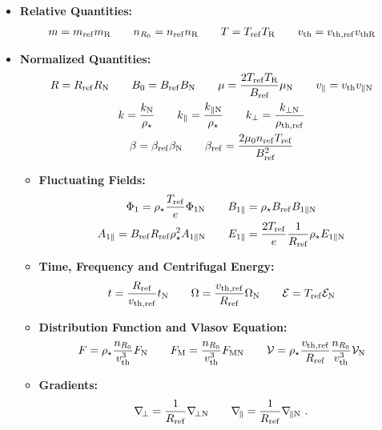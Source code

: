 \begin{itemize}
    \item \textbf{Relative Quantities:}
        \begin{gather*}
            m = m_\mathrm{ref} m_\mathrm{R} \qquad n_{R_0} = n_\mathrm{ref} n_\mathrm{R} \qquad T = T_\mathrm{ref} T_\mathrm{R} \qquad v_\mathrm{th} = v_{\mathrm{th},\mathrm{ref}} v_{\mathrm{th} \mathrm{R}}
        \end{gather*}
    \item \textbf{Normalized Quantities:}
        \begin{gather*}
            R = R_\mathrm{ref} R_\mathrm{N} \qquad B_0 = B_\mathrm{ref} B_\mathrm{N} \qquad \mu = \frac{2 T_\mathrm{ref} T_\mathrm{R}}{B_\mathrm{ref}} \mu_\mathrm{N} \qquad v_\parallel = v_\mathrm{th} v_{\parallel \mathrm{N}} \\
            k = \frac{k_\mathrm{N}}{\rho_\star} \qquad k_\parallel = \frac{k_{\parallel \mathrm{N}}}{\rho_\star} \qquad k_\perp = \frac{k_{\perp \mathrm{N}}}{\rho_{\mathrm{th},\mathrm{ref}}} \\
            \beta = \beta_\mathrm{ref} \beta_\mathrm{N} \qquad \beta_\mathrm{ref} = \frac{2 \mu_0 n_\mathrm{ref} T_\mathrm{ref}}{B_\mathrm{ref}^2}
        \end{gather*}
        \begin{itemize}
            \item \textbf{Fluctuating Fields:}
                \begin{gather*}
                    \Phi_1 = \rho_\star \frac{T_\mathrm{ref}}{e} \Phi_{1 \mathrm{N}} \qquad B_{1\parallel} = \rho_\star B_\mathrm{ref} B_{1\parallel \mathrm{N}} \\
                    A_{1\parallel} = B_\mathrm{ref} R_\mathrm{ref} \rho_\star^2 A_{1\parallel \mathrm{N}} \qquad E_{1\parallel} = \frac{2T_\mathrm{ref}}{e} \frac{1}{R_\mathrm{ref}} \rho_\star E_{1\parallel \mathrm{N}}
                \end{gather*}
            \item \textbf{Time, Frequency and Centrifugal Energy:}
                \begin{gather*}
                    t = \frac{R_\mathrm{ref}}{v_{\mathrm{th},\mathrm{ref}}} t_\mathrm{N} \qquad \Omega = \dfrac{v_{\mathrm{th},\mathrm{ref}}}{R_\mathrm{ref}} \Omega_\mathrm{N} \qquad \mathcal{E} = T_\mathrm{ref} \mathcal{E}_\mathrm{N}
                \end{gather*}
            \item \textbf{Distribution Function and Vlasov Equation:}
                \begin{gather*}
                    F = \rho_\star \frac{n_{R_0}}{v_\mathrm{th}^3}F_\mathrm{N} \qquad F_\mathrm{M} = \frac{n_{R_0}}{v_\mathrm{th}^3} F_{\mathrm{M} \mathrm{N}} \qquad \mathcal{V} = \rho_\star \frac{v_{\mathrm{th},\mathrm{ref}}}{R_\mathrm{ref}}\frac{n_{R_0}}{v_\mathrm{th}^3}\mathcal{V}_\mathrm{N}
                \end{gather*}
            \item \textbf{Gradients:}
                \begin{gather*}
                    \nabla_{\!\perp} = \frac{1}{R_\mathrm{ref}} \nabla_{\!\perp \mathrm{N}} \qquad \nabla_{\!\parallel} = \frac{1}{R_\mathrm{ref}} \nabla_{\!\parallel \mathrm{N}} ~.
                \end{gather*}
        \end{itemize}
\end{itemize}